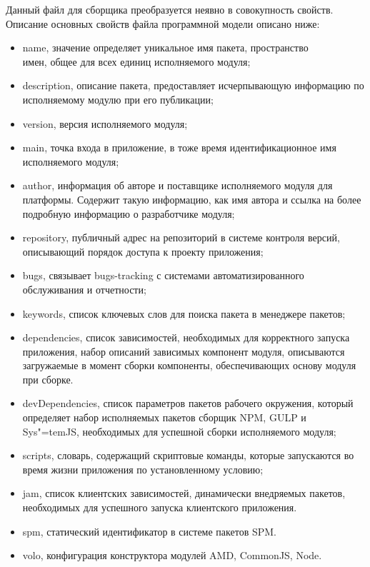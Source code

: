 Данный файл для сборщика \npm{} преобразуется неявно в совокупность свойств. Описание основных свойств файла программной модели описано ниже:
\begin{itemize}
  \item name, значение определяет уникальное имя пакета, пространство \\имен, общее для всех единиц исполняемого модуля;
  \item description, описание пакета, предоставляет исчерпывающую информацию по исполняемому модулю при его публикации;
  \item version, версия исполняемого модуля;
  \item main, точка входа в приложение, в тоже время идентификационное имя исполняемого модуля;
  \item author, информация об авторе и поставщике исполняемого модуля для платформы. Содержит такую информацию, как имя автора и ссылка на более подробную информацию о разработчике модуля;
  \item repository, публичный адрес на репозиторий в системе контроля версий,
  описывающий порядок доступа к проекту приложения;
  \item bugs, связывает bugs-tracking с системами автоматизированного обслуживания и отчетности;
  \item keywords, список ключевых слов для поиска пакета в менеджере пакетов;
  \item dependencies, список зависимостей, необходимых для корректного запуска приложения, набор описаний зависимых компонент модуля, описываются загружаемые в момент сборки компоненты, обеспечивающих основу модуля при сборке.
  \item devDependencies, список параметров пакетов рабочего окружения, который определяет набор исполняемых пакетов сборщик NPM, GULP и Sys"=temJS, необходимых для успешной сборки исполняемого модуля;
  \item scripts, словарь, содержащий скриптовые команды, которые запускаются во время жизни приложения по установленному условию;
  \item jam, список клиентских зависимостей, динамически внедряемых пакетов, необходимых для успешного запуска клиентского приложения.
  \item spm, статический идентификатор в системе пакетов SPM.
  \item volo, конфигурация конструктора модулей  AMD, CommonJS, Node.
\end{itemize}

